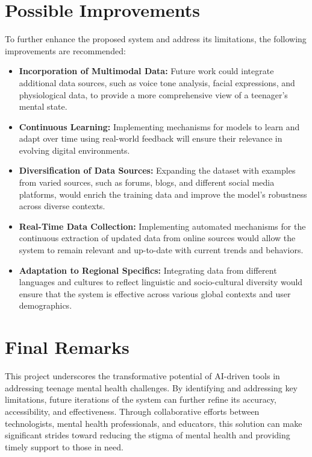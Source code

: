\documentclass[runningheads,a4paper,11pt]{report}
\begin{document}
\section{Possible Improvements} 
To further enhance the proposed system and address its limitations, the following improvements are recommended:

\begin{itemize} 
    \item \textbf{Incorporation of Multimodal Data:} Future work could integrate additional data sources, such as voice tone analysis, facial expressions, and physiological data, to provide a more comprehensive view of a teenager's mental state. 
    \item \textbf{Continuous Learning:} Implementing mechanisms for models to learn and adapt over time using real-world feedback will ensure their relevance in evolving digital environments. 
    \item \textbf{Diversification of Data Sources:} Expanding the dataset with examples from varied sources, such as forums, blogs, and different social media platforms, would enrich the training data and improve the model’s robustness across diverse contexts. 
    \item \textbf{Real-Time Data Collection:} Implementing automated mechanisms for the continuous extraction of updated data from online sources would allow the system to remain relevant and up-to-date with current trends and behaviors. 
    \item \textbf{Adaptation to Regional Specifics:} Integrating data from different languages and cultures to reflect linguistic and socio-cultural diversity would ensure that the system is effective across various global contexts and user demographics.

\end{itemize}

\section{Final Remarks}
This project underscores the transformative potential of AI-driven tools in addressing teenage mental health challenges. By identifying and addressing key limitations, future iterations of the system can further refine its accuracy, accessibility, and effectiveness. Through collaborative efforts between technologists, mental health professionals, and educators, this solution can make significant strides toward reducing the stigma of mental health and providing timely support to those in need.
\end{document}
